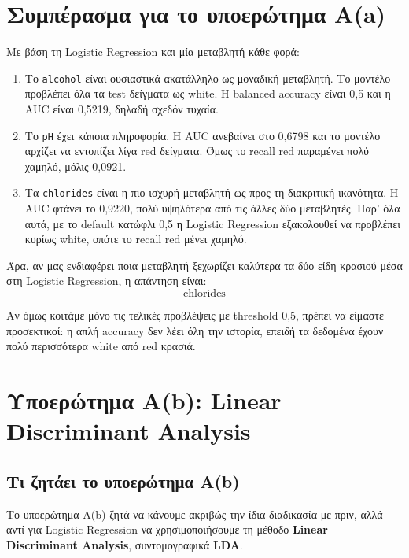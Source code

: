 \documentclass[11pt,a4paper]{article}
\newcommand{\code}[1]{\texttt{#1}}
\begin{document}
\section{Συμπέρασμα για το υποερώτημα Α(a)}

Με βάση τη Logistic Regression και μία μεταβλητή κάθε φορά:

\begin{enumerate}
    \item Το \code{alcohol} είναι ουσιαστικά ακατάλληλο ως μοναδική
    μεταβλητή. Το μοντέλο προβλέπει όλα τα test δείγματα ως white.
    Η balanced accuracy είναι 0,5 και η AUC είναι 0,5219, δηλαδή σχεδόν
    τυχαία.

    \item Το \code{pH} έχει κάποια πληροφορία. Η AUC ανεβαίνει στο 0,6798
    και το μοντέλο αρχίζει να εντοπίζει λίγα red δείγματα. Όμως το recall
    red παραμένει πολύ χαμηλό, μόλις 0,0921.

    \item Τα \code{chlorides} είναι η πιο ισχυρή μεταβλητή ως προς τη
    διακριτική ικανότητα. Η AUC φτάνει το 0,9220, πολύ υψηλότερα από τις
    άλλες δύο μεταβλητές. Παρ' όλα αυτά, με το default κατώφλι 0,5 η
    Logistic Regression εξακολουθεί να προβλέπει κυρίως white, οπότε το
    recall red μένει χαμηλό.
\end{enumerate}

Άρα, αν μας ενδιαφέρει ποια μεταβλητή ξεχωρίζει καλύτερα τα δύο είδη κρασιού
μέσα στη Logistic Regression, η απάντηση είναι:
\[
\boxed{\text{chlorides}}
\]

Αν όμως κοιτάμε μόνο τις τελικές προβλέψεις με threshold 0,5, πρέπει να είμαστε
προσεκτικοί: η απλή accuracy δεν λέει όλη την ιστορία, επειδή τα δεδομένα
έχουν πολύ περισσότερα white από red κρασιά.

\section{Υποερώτημα Α(b): Linear Discriminant Analysis}

\subsection{Τι ζητάει το υποερώτημα Α(b)}

Το υποερώτημα Α(b) ζητά να κάνουμε ακριβώς την ίδια διαδικασία με πριν, αλλά
αντί για Logistic Regression να χρησιμοποιήσουμε τη μέθοδο
\textbf{Linear Discriminant Analysis}, συντομογραφικά \textbf{LDA}.
\end{document}
